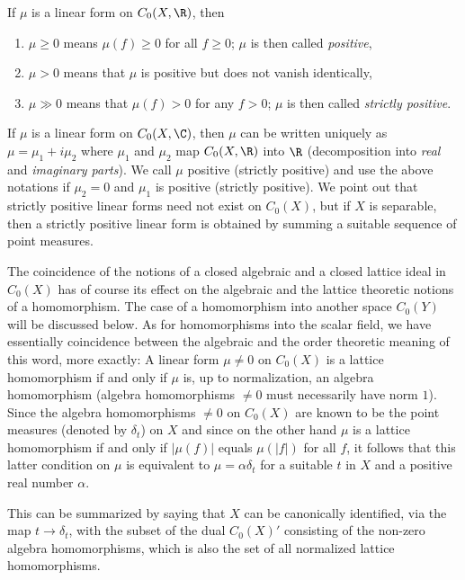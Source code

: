 \noindent If $\mu$ is a linear form on $C_{0}(X,\R)$, then
\begin{enumerate}[label=]

\item
$\mu \geq 0$ means  $ \mu(f) \geq 0 $ for all $ f \geq 0 $;  $ \mu $ is then called \emph{positive},

\item
$ \mu > 0 $ means that $ \mu $ is positive but does not vanish identically,

\item
$ \mu \gg 0 $ means that $ \mu(f) > 0 $ for any $ f > 0 $;  $ \mu $ is then called \emph{strictly positive}.

\end{enumerate}
If $\mu$ is a linear form on $C_{0}(X,\C)$, then $\mu$ can be written uniquely as $\mu = \mu_{1} + i\mu_{2}$ where $\mu_{1}$ and $\mu_{2}$ map $C_{0}(X,\R)$ into $\R$ (decomposition into \emph{real} and \emph{imaginary parts}).
We call $\mu$ positive (strictly positive) and use the above notations if $\mu_{2} = 0$ and $\mu_{1}$ is positive (strictly positive).
We point out that strictly positive linear forms need not exist on $C_{0}(X)$, but if $X$ is separable, then a strictly positive linear form is obtained by summing a suitable sequence of point measures.

The coincidence of the notions of a closed algebraic and a closed lattice ideal in $C_{0}(X)$ has of course its effect on the algebraic and the lattice theoretic notions of a homomorphism.
The case of a homomorphism into another space $C_{0}(Y)$ will be discussed below.
As for homomorphisms into the scalar field, we have essentially coincidence between the algebraic and the order theoretic meaning of this word, more exactly: A linear form $\mu \neq 0$ on $C_{0}(X)$ is a lattice homomorphism if and only if $\mu$ is, up to normalization, an algebra homomorphism (algebra homomorphisms $\neq 0$ must necessarily have norm $1$).
Since the algebra homomorphisms $\neq 0$ on $C_{0}(X)$ are known to be the point measures (denoted by $\delta_{t}$) on $X$ and since on the other hand $\mu$ is a lattice homomorphism if and only if $|\mu(f)|$ equals $\mu(|f|)$ for all $f$, it follows that this latter condition on $\mu$ is equivalent to $\mu = \alpha\delta_{t}$ for a suitable $t$ in $X$ and a positive real number $\alpha$.

This can be summarized by saying that $X$ can be canonically identified, via the map $t \to \delta_{t}$, with the subset of the dual $C_{0}(X)'$ consisting of the non-zero algebra homomorphisms, which is also the set of all normalized lattice homomorphisms.

